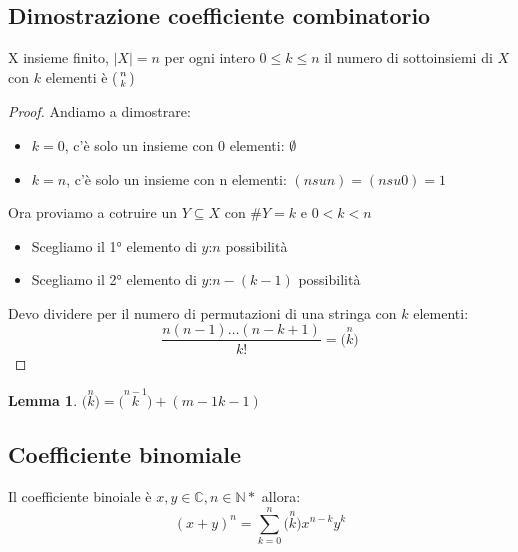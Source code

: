 \documentclass{article}
\theoremstyle{definition}
\newtheorem{lemma}{Lemma}[section]
\begin{document}
\subsection{Dimostrazione coefficiente combinatorio}
X insieme finito, $|X| = n$ per ogni intero $0 \le k \le n$ il numero di sottoinsiemi di $X$ con $k$ elementi è \Big($n \atop k$\Big) \par 
\begin{tcolorbox}
\begin{proof}
Andiamo a dimostrare:
\begin{itemize}
        \item $k=0$, c'è solo un insieme con 0 elementi: $\emptyset$
        \item $k=n$, c'è solo un insieme con n elementi: $(n su n) = (n su 0) = 1$
\end{itemize}

Ora proviamo a cotruire un $Y \subseteq X$ con $\#Y = k$ e $0 < k < n$ \par
\begin{itemize}
        \item Scegliamo il 1° elemento di $y$:$n$ possibilità
        \item Scegliamo il 2° elemento di $y$:$n-(k-1)$ possibilità
\end{itemize}

Devo dividere per il numero di permutazioni di una stringa con $k$ elementi:
\begin{equation*}
        \frac{n(n-1)\ldots(n-k+1)}{k!} = \Big(\overset{n}{k}\Big)
\end{equation*}
\end{proof}
\end{tcolorbox}

\begin{tcolorbox}
\begin{lemma}
$\Big(\overset{n}{k}\Big) = \Big(\overset{n-1}{k}\Big) + (m-1 k-1)$ 
\end{lemma}
\end{tcolorbox}



\subsection{Coefficiente binomiale}
Il coefficiente binoiale è $x,y \in \mathbb{C}, n \in \mathbb{N}*$ allora:
\begin{equation*}
        {(x+y)}^{n} = \sum_{k=0}^{n}\Big(\overset{n}{k}\Big)x^{n-k}y^k
\end{equation*}
\end{document}
